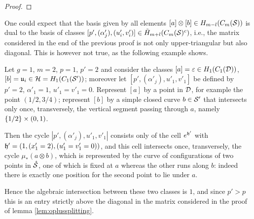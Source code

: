 \begin{proof}
% 
% 
% 
% 
% 
% 
% 
\end{proof}

One could expect that the basis given by all elements $[a]\otimes [b]\in H_{m-l}(\cms)$
is dual to the basis of classes $[p',(\alpha'_j),(u'_i,v'_i)]\in \tH_{m+l}(\cms^c)$, i.e., the
matrix considered in the end of the previous proof is not only upper-triangular but also
diagonal. This is however not true, as the following example shows.

Let $g=1$, $m=2$, $p=1$, $p'=2$ and consider the classes $[a]=\epsilon\in H_1(C_1(\D))$,
$[b]=\u_i\in \H=H_1(C_1(\S'))$; moreover let $[p',(\alpha'_j),u'_1,v'_1]$ be defined by
$p'=2$, $\alpha'_1=1$, $u'_1=v'_1=0$. Represent $[a]$ by a point in $\D$, for example
the point $(1/2,3/4)$; represent $[b]$ by a simple closed curve $b\in\S'$
that intersects only once, transversely, the vertical segment passing through $a$, namely
$\set{1/2}\times(0,1)$.

Then the cycle $|p',(\alpha'_j),u'_1,v'_1|$ consists only of the cell $e^{\tup'}$ with
$\tup'=(1,(x'_1=2),(u'_1=v'_1=0))$, and this cell intersects once, transversely,
the cycle $\mu_*(a\otimes b)$, which is represented by the curve of configurations of two
points in $\mrS$, one of which is fixed at $a$ whereas the other runs along $b$: indeed
there is exactly one position for the second point to lie under $a$.

Hence the algebraic intersection between these two classes is $1$, and since $p'>p$
this is an entry strictly above the diagonal in the matrix considered in the proof
of lemma \ref{lem:oplussplitting}.


